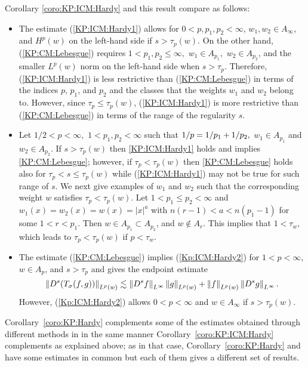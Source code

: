 Corollary \ref{coro:KP:ICM:Hardy} and this result compare as follows: 
\begin{itemize}
\item The estimate (\ref{KP:ICM:Hardy1}) allows for $0<p,p_1,p_2 < \infty$, $w_1,w_2 \in A_\infty$, and $H^p(w)$ on the left-hand side if $s>\tau_p(w)$. On the other hand, (\ref{KP:CM:Lebesgue}) requires $1<p_1,p_2\le \infty,$ $w_1\in A_{p_1},$ $w_2\in A_{p_2}$, and the smaller $L^p(w)$ norm on the left-hand side when $s>\tau_{p}$. Therefore, (\ref{KP:ICM:Hardy1}) is less restrictive than (\ref{KP:CM:Lebesgue}) in terms of the indices $p$, $p_1$, and $p_2$ and the classes that the weights $w_1$ and $w_2$ belong to. However, since $\tau_{p} \leq \tau_p(w)$, (\ref{KP:ICM:Hardy1}) is more restrictive than (\ref{KP:CM:Lebesgue}) in terms of the range of the regularity $s$.
\item  Let  $1/2<p<\infty,$ $1<p_1,p_2<\infty$ such that $1/p=1/p_1+1/p_2,$  $w_1\in A_{p_1}$ and $w_2\in A_{p_2}$. If $s>\tau_{p}(w)$ then \eqref{KP:ICM:Hardy1} holds and implies \eqref{KP:CM:Lebesgue}; however, if $\tau_p < \tau_p(w)$ then \eqref{KP:CM:Lebesgue} holds also for $\tau_p < s \leq \tau_p(w)$ while (\ref{KP:ICM:Hardy1}) may not be true for such range of $s$. We next give examples of $w_1$ and $w_2$ such that the corresponding weight $w$ satisfies $\tau_p < \tau_p(w)$.  Let $1<p_1\leq p_2 <\infty$ and $w_1(x) = w_2(x) = w(x) = |x|^a$ with $n(r-1)<a<n(p_1-1)$ for some $1<r<p_1$. Then $w \in A_{p_1} \subset A_{p_2}$, and $w \notin A_r$. This implies that $1<\tau_w$, which leads to $\tau_p < \tau_p(w)$ if $p<\tau_w$. 
\item  The estimate (\ref{KP:CM:Lebesgue}) implies (\ref{Kp:ICM:Hardy2}) for $1<p<\infty$, $w\in A_p$, and $s>\tau_{p}$ and gives the endpoint estimate 
$$ \left\|D^s(T_\sigma(f,g))\right\|_{L^p(w)} \lesssim \left\|D^s f\right\|_{L^{\infty}} \left\|g\right\|_{L^{p}(w)} +  \left\|f\right\|_{L^{p}(w)}\left\|D^s g\right\|_{L^\infty}. $$
\noindent However, (\ref{Kp:ICM:Hardy2}) allows $0<p<\infty$ and $w\in A_\infty$ if $s>\tau_p (w)$.
\end{itemize}




Corollary~\ref{coro:KP:Hardy} complements some of the estimates obtained through different methods in \cite[Theorem 1.1]{MR3513582} in the same manner  Corollary~\ref{coro:KP:ICM:Hardy} complements  \cite[Theorem 1.1]{BrNa2017} as explained above; as in that case, 
 Corollary~\ref{coro:KP:Hardy} and \cite[Theorem 1.1]{MR3513582} have some estimates in common but each of them gives a different set of results.


